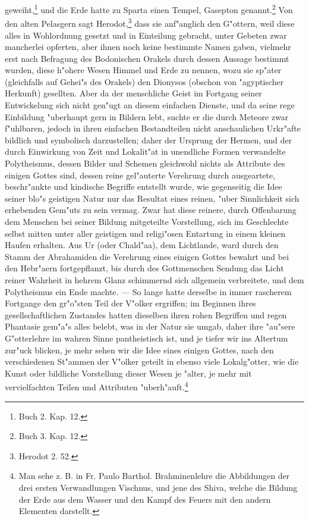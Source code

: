 \documentclass[a4paper, 11pt, oneside, polutonikogreek, german]{article}
\begin{document}
geweiht,\footnote{Buch 2. Kap. 12.} und die Erde hatte zu Sparta einen Tempel, Gasepton genannt.\footnote{Buch 3. Kap. 12.} Von den alten Pelasgern sagt Herodot,\footnote{Herodot 2. 52.} dass sie anf"anglich den G"ottern, weil diese alles in Wohlordnung gesetzt und in Einteilung gebracht, unter Gebeten zwar mancherlei opferten, aber ihnen noch keine bestimmte Namen gaben, vielmehr erst nach Befragung des Bodonischen Orakels durch dessen Aussage bestimmt wurden, diese h"ohere Wesen Himmel und Erde zu nennen, wozu sie sp"ater (gleichfalls auf Gehei"s des Orakels) den Dionysos (obschon von "agyptischer Herkunft) gesellten. Aber da der menschliche Geist im Fortgang seiner Entwickelung sich nicht gen"ugt an diesem einfachen Dienste, und da seine rege Einbildung "uberhaupt gern in Bildern lebt, suchte er die durch Meteore zwar f"uhlbaren, jedoch in ihren einfachen Bestandteilen nicht anschaulichen Urkr"afte bildlich und symbolisch darzustellen; daher der Ursprung der Hermen, und der durch Einwirkung von Zeit und Lokalit"at in unendliche Formen verwandelte Polytheismus, dessen Bilder und Schemen gleichwohl nichts als Attribute des einigen Gottes sind, dessen reine gel"auterte Verehrung durch ausgeartete, beschr"ankte und kindische Begriffe entstellt wurde, wie gegenseitig die Idee seiner blo"s geistigen Natur nur das Resultat eines reinen, "uber Sinnlichkeit sich erhebenden Gem"uts zu sein vermag. Zwar hat diese reinere, durch Offenbarung dem Menschen bei seiner Bildung mitgeteilte Vorstellung, sich im Geschlechte selbst mitten unter aller geistigen und religi"osen Entartung in einem kleinen Haufen erhalten. Aus Ur (oder Chald"aa), dem Lichtlande, ward durch den Stamm der Abrahamiden die Verehrung eines einigen Gottes bewahrt und bei den Hebr"aern fortgepflanzt, bis durch des Gottmenschen Sendung das Licht reiner Wahrheit in hehrem Glanz schimmernd sich allgemein verbreitete, und dem Polytheismus ein Ende machte. --- So lange hatte derselbe in immer rascherem Fortgange den gr"o"sten Teil der V"olker ergriffen; im Beginnen ihres gesellschaftlichen Zustandes hatten dieselben ihren rohen Begriffen und regen Phantasie gem"a"s alles belebt, was in der Natur sie umgab, daher ihre "au"sere G"otterlehre im wahren Sinne pantheistisch ist, und je tiefer wir ins Altertum zur"uck blicken, je mehr sehen wir die Idee eines einigen Gottes, nach den verschiedenen St"ammen der V"olker geteilt in ebenso viele Lokalg"otter, wie die Kunst oder bildliche Vorstellung dieser Wesen je "alter, je mehr mit vervielfachten Teilen und Attributen "uberh"auft.\footnote{Man sehe z. B. in Fr. Paulo Barthol. Brahminenlehre die Abbildungen der drei ersten Verwandlungen Vischnus, und jene des Shiva, welche die Bildung der Erde aus dem Wasser und den Kampf des Feuers mit den andern Elementen darstellt.}
\end{document}

